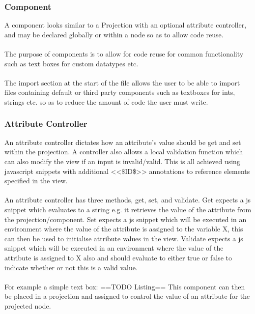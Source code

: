 \documentclass{report}
\begin{document}
\subsubsection{Component}


A component looks similar to a  Projection with an optional attribute controller, and may be declared globally or within a node so as to allow code reuse.
\\
\\
The purpose of components is to allow for code reuse for common functionality such as text boxes for custom datatypes etc.
\\
\\
The import section at the start of the file allows the user to be able to import files containing default or third party components such as textboxes for ints, strings etc. so as to reduce the amount of code the user must write. 

\subsubsection{Attribute Controller}

An attribute controller dictates how an attribute's value should be get and set within the projection. A controller also allows a local validation function which can also modify the view if an input is invalid/valid. This is all achieved using javascript snippets with additional <<\$ID\$>> annotations to reference elements specified in the view.
\\
\\
An attribute controller has three methods, get, set, and validate. Get expects a js snippet which evaluates to a string e.g. it retrieves the value of the attribute from the projection/component. Set expects a js snippet which will be executed in an environment where the value of the attribute is assigned to the variable X, this can then be used to initialise attribute values in the view. Validate expects a js snippet which will be executed in an environment where the value of the attribute is assigned to X also and should evaluate to either true or false to indicate whether or not this is a valid value. 
\\
\\
For example a simple text box: ==TODO Listing==
This component can then be placed in a projection and assigned to control the value of an attribute for the projected node.
\end{document}
